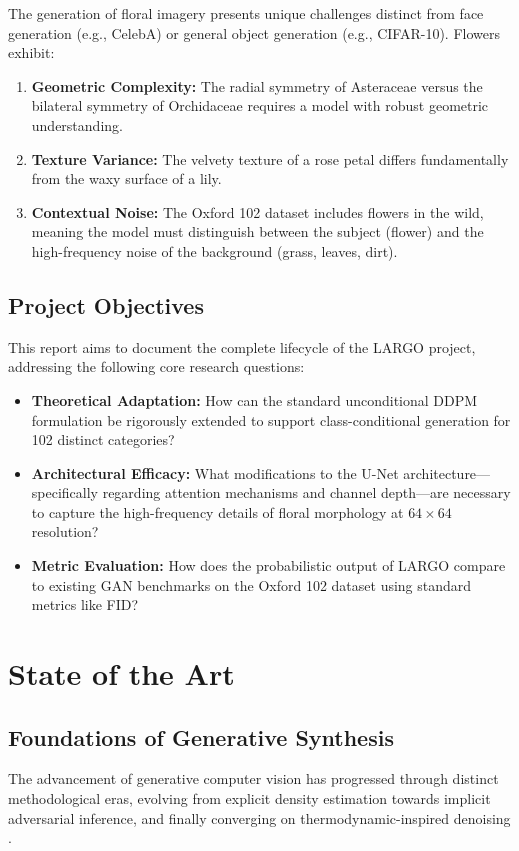 \documentclass[12pt, a4paper]{article}
\begin{document}
The generation of floral imagery presents unique challenges distinct from face generation (e.g., CelebA) or general object generation (e.g., CIFAR-10). Flowers exhibit:
\begin{enumerate}
    \item \textbf{Geometric Complexity:} The radial symmetry of Asteraceae versus the bilateral symmetry of Orchidaceae requires a model with robust geometric understanding.
    \item \textbf{Texture Variance:} The velvety texture of a rose petal differs fundamentally from the waxy surface of a lily.
    \item \textbf{Contextual Noise:} The Oxford 102 dataset \cite{oxford102} includes flowers in the wild, meaning the model must distinguish between the subject (flower) and the high-frequency noise of the background (grass, leaves, dirt).
\end{enumerate}

\subsection{Project Objectives}
This report aims to document the complete lifecycle of the LARGO project, addressing the following core research questions:
\begin{itemize}
    \item \textbf{Theoretical Adaptation:} How can the standard unconditional DDPM formulation be rigorously extended to support class-conditional generation for 102 distinct categories?
    \item \textbf{Architectural Efficacy:} What modifications to the U-Net architecture—specifically regarding attention mechanisms and channel depth—are necessary to capture the high-frequency details of floral morphology at $64 \times 64$ resolution?
    \item \textbf{Metric Evaluation:} How does the probabilistic output of LARGO compare to existing GAN benchmarks on the Oxford 102 dataset using standard metrics like FID?
\end{itemize}


\section{State of the Art}

\subsection{Foundations of Generative Synthesis}
The advancement of generative computer vision has progressed through distinct methodological eras, evolving from explicit density estimation towards implicit adversarial inference, and finally converging on thermodynamic-inspired denoising \cite{dhariwal2021}.
\end{document}
